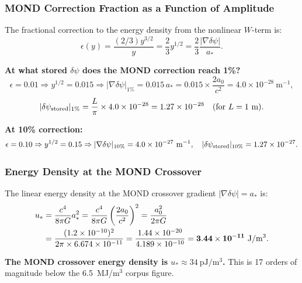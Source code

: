 \documentclass[aps,prd,twocolumn,superscriptaddress]{revtex4-2}
\newcommand{\deltapsi}{\delta\psi}
\newcommand{\astar}{a_*}
\newcommand{\azero}{a_0}
\begin{document}
\subsubsection{MOND Correction Fraction as a Function of Amplitude}

The fractional correction to the energy density from the nonlinear
$W$-term is:
\begin{equation}
\epsilon(y) = \frac{(2/3)y^{3/2}}{y} = \frac{2}{3}y^{1/2}
= \frac{2}{3}\frac{|\nabla\deltapsi|}{\astar}.
\end{equation}

\textbf{At what stored $\deltapsi$ does the MOND correction reach 1\%?}
\begin{equation}
\epsilon = 0.01 \Rightarrow y^{1/2} = 0.015
\Rightarrow |\nabla\deltapsi|_{1\%} = 0.015\,\astar
= 0.015\times\frac{2\azero}{c^2} = 4.0\times 10^{-28}~\mathrm{m^{-1}},
\end{equation}
\begin{equation}
|\deltapsi_{\rm stored}|_{1\%} = \frac{L}{\pi}\times 4.0\times 10^{-28}
= 1.27\times 10^{-28}\quad(\text{for }L=1~\mathrm{m}).
\end{equation}

\textbf{At 10\% correction:}
\begin{equation}
\epsilon = 0.10 \Rightarrow y^{1/2} = 0.15
\Rightarrow |\nabla\deltapsi|_{10\%} = 4.0\times 10^{-27}~\mathrm{m^{-1}},
\quad |\deltapsi_{\rm stored}|_{10\%} = 1.27\times 10^{-27}.
\end{equation}

\subsubsection{Energy Density at the MOND Crossover}

The linear energy density at the MOND crossover gradient $|\nabla\deltapsi|
= \astar$ is:
\begin{align}
u_* &= \frac{c^4}{8\pi G}\astar^2
= \frac{c^4}{8\pi G}\left(\frac{2\azero}{c^2}\right)^2
= \frac{\azero^2}{2\pi G} \notag\\
&= \frac{(1.2\times 10^{-10})^2}{2\pi\times 6.674\times 10^{-11}}
= \frac{1.44\times 10^{-20}}{4.189\times 10^{-10}}
= \mathbf{3.44\times 10^{-11}~\mathrm{J/m^3}}.
\end{align}

\textbf{The MOND crossover energy density is $u_* \approx 34~\mathrm{pJ/m^3}$.}
This is 17 orders of magnitude below the 6.5~MJ/m$^3$ corpus figure.
\end{document}
